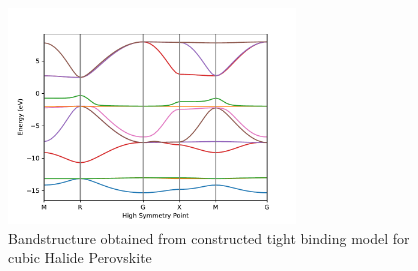 \documentclass{article}
\begin{document}
\begin{figure}[h!]
    \centering
    \includegraphics[width=3in]{../figures/HalidePerovskite_band.pdf}
    \caption{Bandstructure obtained from constructed tight binding model for cubic Halide Perovskite}
    \label{F:Application_Perovskite_band}
\end{figure}
\end{document}
